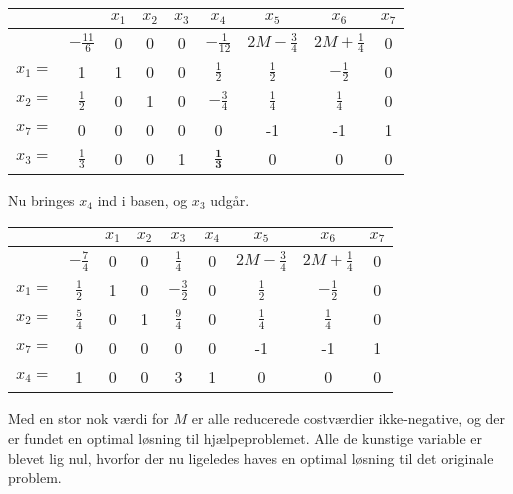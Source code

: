 \begin{eks}
\begin{center}
\begin{tabular}{|c|c|ccccccc|}
\hline
	 &  & $x_1$ & $x_2$ & $x_3$ & $x_4$ & $x_5$ & $x_6$ & $x_7$ \\
\hline
	 & $- \frac{11}{6}$ & 0 & 0 & 0 & $-\frac{1}{12}$ & $2M-\frac{3}{4}$ & $2M+ \frac{1}{4}$ & 0 \\
\hline
	$x_1=$ & 1 & 1 & 0 & 0 & $\frac{1}{2}$ & $\frac{1}{2}$ & $-\frac{1}{2}$ & 0 \\
	$x_2=$ & $\frac{1}{2}$ & 0 & 1 & 0 & $-\frac{3}{4}$ & $\frac{1}{4}$ & $\frac{1}{4}$ & 0 \\
	$x_7=$ & 0 & 0 & 0 & 0 & 0 & -1 & -1 & 1 \\
	$x_3=$ & $\frac{1}{3}$ & 0 & 0 & 1 & $\mathbf{\frac{1}{3}}$ & 0 & 0 & 0 \\
\hline
\end{tabular}
\end{center}

Nu bringes $x_4$ ind i basen, og $x_3$ udgår. 

\begin{center}
\begin{tabular}{|c|c|ccccccc|}
\hline
	 &  & $x_1$ & $x_2$ & $x_3$ & $x_4$ & $x_5$ & $x_6$ & $x_7$ \\
\hline
	 & $- \frac{7}{4}$ & 0 & 0 & $\frac{1}{4}$ & 0 & $2M-\frac{3}{4}$ & $2M+ \frac{1}{4}$ & 0 \\
\hline
	$x_1=$ & $\frac{1}{2}$ & 1 & 0 & $-\frac{3}{2}$ & 0 & $\frac{1}{2}$ & $-\frac{1}{2}$ & 0 \\
	$x_2=$ & $\frac{5}{4}$ & 0 & 1 & $\frac{9}{4}$ & 0 & $\frac{1}{4}$ & $\frac{1}{4}$ & 0 \\
	$x_7=$ & 0 & 0 & 0 & 0 & 0 & -1 & -1 & 1 \\
	$x_4=$ & 1 & 0 & 0 & 3 & 1 & 0 & 0 & 0 \\
\hline
\end{tabular}
\end{center}

Med en stor nok værdi for $M$ er alle reducerede costværdier ikke-negative, og der er fundet en optimal løsning til hjælpeproblemet.
Alle de kunstige variable er blevet lig nul, hvorfor der nu ligeledes haves en optimal løsning til det originale problem.  
\end{eks}